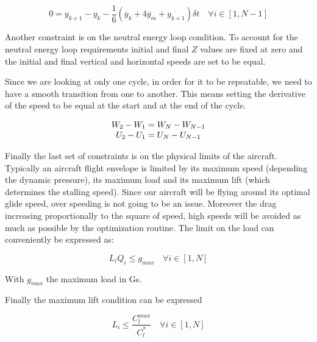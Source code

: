 \begin{equation}
  0=y_{k+1} - y_k - \frac{1}{6}( \dot{y_k} + 4 \dot{y_m} + \dot{y_{k+1}})\delta t \quad \forall i \in [1,N-1]
  \label{eqn:simpson}
\end{equation}

\par Another constraint is on the neutral energy loop condition.
To account for the neutral energy loop requirements initial and final $Z$ values are fixed at zero and the initial and final vertical and horizontal speeds are set to be equal.

\par Since we are looking at only one cycle, in order for it to be repeatable, we need to have a smooth transition from one to another.
This means setting the derivative of the speed to be equal at the start and at the end of the cycle.

\begin{equation}
  \begin{array}[c]{c}
    W_2 - W_1 = W_N - W_{N-1} \\
    U_2 - U_1 = U_N - U_{N-1} 
  \end{array}
  \label{eqn:derivative_constraint}
\end{equation}

\par Finally the last set of constraints is on the physical limits of the aircraft.
Typically an aircraft flight envelope is limited by its maximum speed (depending the dynamic pressure), its maximum load and its maximum lift (which determines the stalling speed).
Since our aircraft will be flying around its optimal glide speed, over speeding is not going to be an issue.
Moreover the drag increasing proportionally to the square of speed, high speeds will be avoided as much as possible by the optimization routine.
The limit on the load can conveniently be expressed as:

\begin{equation}
  L_i Q_i \leq g_{max} \quad \forall i \in [1,N]
  \label{eqn:load_constraint}
\end{equation}

With $g_{max}$ the maximum load in Gs.


\par Finally the maximum lift condition can be expressed

\begin{equation}
  L_i \le \frac{C_l^{max}}{C_l^*} \quad \forall i \in [1,N]
  \label{eqn:lift_constraint}
\end{equation}

